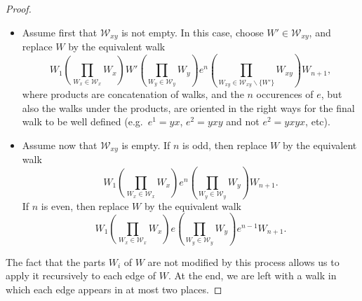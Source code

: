 \documentclass[10pt,a4paper]{amsart}
\begin{document}
\begin{proof}
  \begin{itemize}
      \item Assume first that $\mathcal{W}_{xy}$ is not empty. In this case, choose $W'\in\mathcal{W}_{xy}$, and replace
  $W$ by
  the equivalent walk
  \[
      W_1\left( \prod_{W_x\in\mathcal{W}_x}W_x \right)W'\left( \prod_{W_y\in\mathcal{W}_y}W_y \right) e^n\left(\prod_{W_{xy}\in\mathcal{W}_{xy}\backslash\{W'\}}W_{xy}\right)W_{n+1},
  \]
  where products are concatenation of walks, and the $n$ occurences of $e$, but also the walks under the products, are oriented in the right ways for the final walk to be well defined (e.g.~$e^1=yx$, $e^2=yxy$ and not $e^2=yxyx$, etc).
  
  \item Assume now that $\mathcal{W}_{xy}$ is empty. If $n$ is odd, then replace $W$ by the equivalent walk
  \[
    W_1\left( \prod_{W_x\in\mathcal{W}_x}W_x \right)e^n\left( \prod_{W_y\in\mathcal{W}_y}W_y \right)W_{n+1}.
  \]
  If $n$ is even, then replace $W$ by the equivalent walk
  \[
    W_1\left( \prod_{W_x\in\mathcal{W}_x}W_x \right)e\left( \prod_{W_y\in\mathcal{W}_y}W_y \right)e^{n-1}W_{n+1}.
  \]
  \end{itemize}
  
  The fact that the parts $W_i$ of $W$ are not modified by this process allows us to apply it recursively to each edge of $W$.
  At the end, we are left with a walk in which each edge appears in at most two places.
\end{proof}
\end{document}
